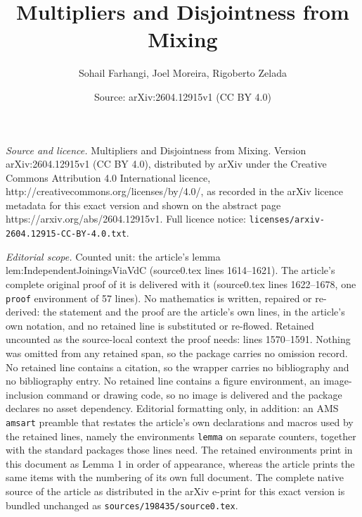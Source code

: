 \documentclass[10pt,a4paper]{amsart}
\title{Multipliers and Disjointness from Mixing}
\author{Sohail Farhangi, Joel Moreira, Rigoberto Zelada}
\date{Source: arXiv:2604.12915v1 (CC BY 4.0)}
\begin{document}
\maketitle

\noindent\emph{Source and licence.} Multipliers and Disjointness from Mixing. Version arXiv:2604.12915v1 (CC BY 4.0), distributed by arXiv under the Creative Commons Attribution 4.0 International licence, http://creativecommons.org/licenses/by/4.0/, as recorded in the arXiv licence metadata for this exact version and shown on the abstract page https://arxiv.org/abs/2604.12915v1. Full licence notice: \texttt{licenses/arxiv-2604.12915-CC-BY-4.0.txt}.\par\smallskip

\noindent\textit{Editorial scope.} Counted unit: the article's lemma lem:IndependentJoiningsViaVdC (source0.tex lines 1614--1621). The article's complete original proof of it is delivered with it (source0.tex lines 1622--1678, one \texttt{proof} environment of 57 lines). No mathematics is written, repaired or re-derived: the statement and the proof are the article's own lines, in the article's own notation, and no retained line is substituted or re-flowed.  Retained uncounted as the source-local context the proof needs: lines 1570--1591.  Nothing was omitted from any retained span, so the package carries no omission record.  No retained line contains a citation, so the wrapper carries no bibliography and no bibliography entry.  No retained line contains a figure environment, an image-inclusion command or drawing code, so no image is delivered and the package declares no asset dependency.  Editorial formatting only, in addition: an AMS \texttt{amsart} preamble that restates the article's own declarations and macros used by the retained lines, namely the environments \texttt{lemma} on separate counters, together with the standard packages those lines need.  The retained environments print in this document as Lemma 1 in order of appearance, whereas the article prints the same items with the numbering of its own full document.  The complete native source of the article as distributed in the arXiv e-print for this exact version is bundled unchanged as \texttt{sources/198435/source0.tex}.
\end{document}
